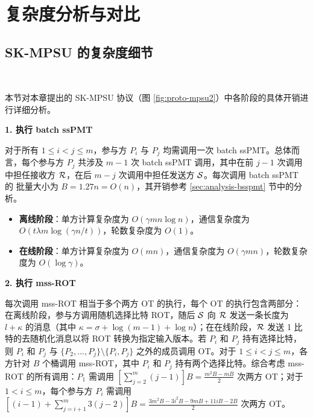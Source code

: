 \section{复杂度分析与对比}

\subsection{SK-MPSU 的复杂度细节}~\label{sec:analysis-ske}

本节对本章提出的 SK-MPSU 协议（图 \ref{fig:proto-mpsu2}）中各阶段的具体开销进行详细分析。
\begin{trivlist}

\item \textbf{1. 执行 batch ssPMT} 

对于所有 $1 \le i < j \le m$，参与方 $P_i$ 与 $P_j$ 均需调用一次 batch ssPMT。总体而言，每个参与方 $P_j$ 共涉及 $m-1$ 次 batch ssPMT 调用，其中在前 $j-1$ 次调用中担任接收方 $\mathcal{R}$，在后 $m-j$ 次调用中担任发送方 $\mathcal{S}$。每次调用 batch ssPMT 的 批量大小为 $B = 1.27n = O(n)$，其开销参考 \ref{sec:analysis-bsspmt} 节中的分析。

\begin{itemize}
\item \textbf{离线阶段}：单方计算复杂度为 $O(\gamma m n \log n)$，通信复杂度为 $O(t \lambda m \log (\gamma n / t))$，轮数复杂度为 $O(1)$。
\item \textbf{在线阶段}：单方计算复杂度为 $O(m n)$，通信复杂度为 $O(\gamma m n)$，轮数复杂度为 $O(\log \gamma)$。
\end{itemize}

\item \textbf{2. 执行 mss-ROT}

每次调用 mss-ROT 相当于多个两方 OT 的执行，每个 OT 的执行包含两部分：在离线阶段，参与方调用随机选择比特 ROT，随后 $\mathcal{S}$ 向 $\mathcal{R}$ 发送一条长度为 $l + \kappa$ 的消息（其中 $\kappa = \sigma + \log (m-1) + \log n$）；在在线阶段，$\mathcal{R}$ 发送 1 比特的去随机化消息以将 ROT 转换为指定输入版本。若 $P_i$ 和 $P_j$ 持有选择比特，则 $P_i$ 和 $P_j$ 与 $\{P_2, \dots, P_j\} \setminus \{P_i, P_j\}$ 之外的成员调用 OT。对于 $1 \le i < j \le m$，各方针对 $B$ 个桶调用 mss-ROT，其中 $P_i$ 和 $P_j$ 持有两个选择比特。综合考虑 mss-ROT 的所有调用：$P_1$ 需调用 $[\sum_{j = 2}^m (j-1)]B = \frac{m^2B - mB}{2}$ 次两方 OT；对于 $1 < i \le m$，每个参与方 $P_i$ 需调用 $[(i - 1) + \sum_{j = i+1}^m 3(j-2)]B = \frac{3m^2B - 3i^2B - 9mB + 11iB - 2B}{2}$ 次两方 OT。


\end{trivlist}
